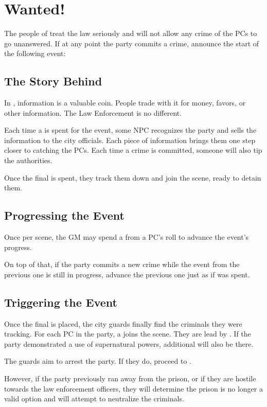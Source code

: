 \section{Wanted!}
\label{sec:wanted}

The people of \locationYeddaw{} treat the law seriously and will not allow any crime of the PCs to go unanswered. If at any point the party commits a crime, announce the start of the following event: \\


\subsection{The Story Behind}

In \locationYeddaw{}, information is a valuable coin. People trade with it for money, favors, or other information. The Law Enforcement is no different.

Each time a \iconComp{} is spent for the event, some NPC recognizes the party and sells the information to the city officials. Each piece of information brings them one step closer to catching the PCs. Each time a crime is committed, someone will also tip the authorities.

Once the final \iconComp{} is spent, they track them down and join the scene, ready to detain them.



\subsection{Progressing the Event}

Once per scene, the GM may spend a \iconComp{} from a PC's roll to advance the event's progress. 

On top of that, if the party commits a new crime while the event from the previous one is still in progress, advance the previous one just as if  \iconComp{} was spent.




\subsection{Triggering the Event}

Once the final \iconComp{} is placed, the city guards finally find the criminals they were tracking. For each PC in the party, a \enemyGuardB{} joins the scene. They are lead by \enemyGuardC{}. If the party demonstrated a use of supernatural powers, additional \enemySkybreakerC{} will also be there.

The guards aim to arrest the party. If they do, proceed to .

However, if the party previously ran away from the prison, or if they are hostile towards the law enforcement officers, they will determine the prison is no longer a valid option and will attempt to neutralize the criminals.